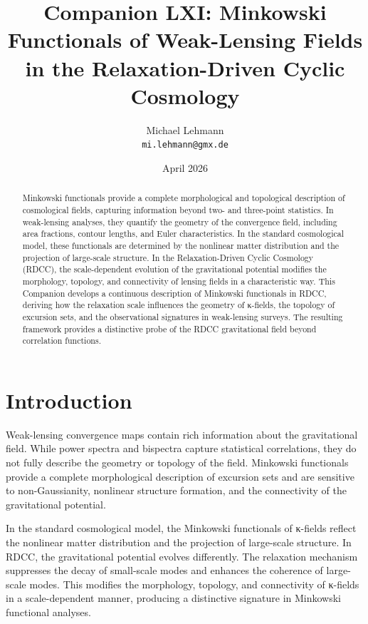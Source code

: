 \documentclass[11pt,a4paper]{article}
\title{\textbf{Companion LXI: Minkowski Functionals of Weak-Lensing Fields in the Relaxation-Driven Cyclic Cosmology}}
\author{Michael Lehmann \\ \texttt{mi.lehmann@gmx.de}}
\date{April 2026}
\begin{document}
\maketitle

\begin{abstract}
Minkowski functionals provide a complete morphological and topological description 
of cosmological fields, capturing information beyond two- and three-point 
statistics. In weak-lensing analyses, they quantify the geometry of the convergence 
field, including area fractions, contour lengths, and Euler characteristics. In the 
standard cosmological model, these functionals are determined by the nonlinear 
matter distribution and the projection of large-scale structure. In the 
Relaxation-Driven Cyclic Cosmology (RDCC), the scale-dependent evolution of the 
gravitational potential modifies the morphology, topology, and connectivity of 
lensing fields in a characteristic way. This Companion develops a continuous 
description of Minkowski functionals in RDCC, deriving how the relaxation scale 
influences the geometry of κ-fields, the topology of excursion sets, and the 
observational signatures in weak-lensing surveys. The resulting framework provides 
a distinctive probe of the RDCC gravitational field beyond correlation functions.
\end{abstract}
\section{Introduction}

Weak-lensing convergence maps contain rich information about the gravitational 
field. While power spectra and bispectra capture statistical correlations, they do 
not fully describe the geometry or topology of the field. Minkowski functionals 
provide a complete morphological description of excursion sets and are sensitive to 
non-Gaussianity, nonlinear structure formation, and the connectivity of the 
gravitational potential.

In the standard cosmological model, the Minkowski functionals of κ-fields reflect 
the nonlinear matter distribution and the projection of large-scale structure. In 
RDCC, the gravitational potential evolves differently. The relaxation mechanism 
suppresses the decay of small-scale modes and enhances the coherence of large-scale 
modes. This modifies the morphology, topology, and connectivity of κ-fields in a 
scale-dependent manner, producing a distinctive signature in Minkowski functional 
analyses.
\end{document}
